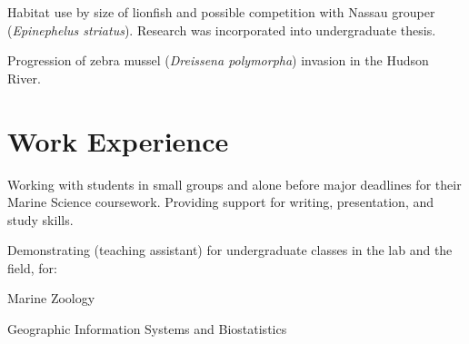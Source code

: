 \documentclass[a4paper]{deedy-resume} %
\begin{document}
Habitat use by size of lionfish and possible competition with Nassau grouper (\textit{Epinephelus striatus}). Research was incorporated into undergraduate thesis.

\sectionspace %



Progression of zebra mussel (\textit{Dreissena polymorpha}) invasion in the Hudson River.

\sectionspace %
\sectionspace



\section{Work Experience}



Working with students in small groups and alone before major deadlines for their Marine Science coursework. Providing support for writing, presentation, and study skills.

\sectionspace



Demonstrating (teaching assistant) for undergraduate classes in the lab and the field, for:
\begin{tightitemize}
\item Marine Zoology
\item Geographic Information Systems and Biostatistics
\end{tightitemize}



\end{document}
